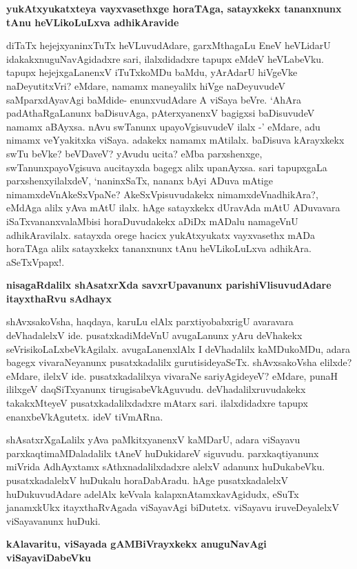 {\bigskip
\noindent
{\large\bf yukAtxyukatxteya vayxvasethxge horaTAga, satayxkekx tananxnunx tAnu heVLikoLuLxva adhikAravide}}\label{249}
\medskip

\noindent
diTaTx hejejxyaninxTuTx heVLuvudAdare, garxMthagaLu EneV heVLidarU idakakxnuguNa\-vAgidadxre sari, ilalx\-didadxre tapupx eMdeV heVLabeVku. tapupx hejejxgaLanenxV iTuTxkoMDu baMdu, yArAdarU hiVgeVke naDeyu\-titxVri? eMdare, namamx maneyalilx hiVge naDeyuvudeV saMparxdAyavAgi baMdide- enunxvudAdare A viSaya beVre. `AhAra padAthaRgaLanunx baDisuvAga, pAterxyanenxV bagigxsi baDisuvudeV namamx aBAyxsa. nAvu swTanunx upayoVgisuvudeV ilalx -' eMdare, adu nimamx veYyakitxka viSaya. adakekx namamx mAtilalx.\- baDisuva kArayxkekx swTu beVke? beVDaveV? yAvudu ucita? eMba parxshenxge, swTanunxpayoVgisuva auci\-tayxda bagegx alilx upanAyxsa. sari tapupxgaLa parxshenxyilalxdeV, `naninxSaTx, nananx bAyi ADuva mAtige nimamxdeVnA\-keSxVpaNe? AkeSxVpisuvudakekx nimamxdeVnadhikAra?, eMdAga alilx yAva mAtU ilalx. hAge satayxkekx dUravAda mAtU ADuvavara iSaTxvananxvalaMbisi horaDuvudakekx aDiDx mADalu namageVnU adhikAravilalx. satayxda orege hacicx yukAtxyukatx vayxvasethx mADa horaTAga alilx satayxkekx tananxnunx tAnu heVLikoLuLxva adhikAra. aSeTxVpapx!.

{\bigskip
\noindent
{\large\bf nisagaRdalilx shAsatxrXda savxrUpavanunx parishiVlisuvudAdare itayxthaRvu sAdhayx}}\label{page249}
\medskip

\noindent
shAvxsakoVsha, haqdaya, karuLu elAlx parxtiyobabxrigU avaravara deVhadalelxV ide. pusatxkadiMdeVnU avugaLanunx yAru deVhakekx seVrisikoLaLxbeVkAgilalx. avugaLanenxlAlx I deVhadalilx kaMDukoMDu, adara bagegx vivaraNeyanunx pusatxkadalilx gurutisideyaSeTx. shAvxsakoVsha elilxde? eMdare, ilelxV ide. pusatxkadalilxya vivaraNe sariyAgideyeV? eMdare, punaH ililxgeV daqSiTxyanunx tirugisabeVkAguvudu. deVhadalilxruvudakekx takakxMteyeV pusatxkadalilxdadxre mAtarx sari. ilalxdidadxre tapupx enanxbeVkAgutetx. ideV tiVmARna.

shAsatxrXgaLalilx yAva paMkitxyanenxV kaMDarU, adara viSayavu parxkaqtimaMDaladalilx tAneV huDuki\-dareV siguvudu. parxkaqtiyanunx miVrida AdhAyxtamx sAthxnadalilxdadxre alelxV adanunx huDukabeVku. pusatxka\-dalelxV huDu\-kalu horaDabAradu. hAge pusatxkadalelxV huDukuvudAdare adelAlx keVvala kalapxnAtamxka\-vAgidudx, eSuTx janamxkUkx itayxthaRvAgada viSayavAgi biDutetx. viSayavu iruveDeyalelxV viSayavanunx huDuki.

{\bigskip
\noindent
{\large\bf kAlavaritu, viSayada gAMBiVrayxkekx anuguNavAgi viSayaviDabeVku}}\label{page250}
\medskip

